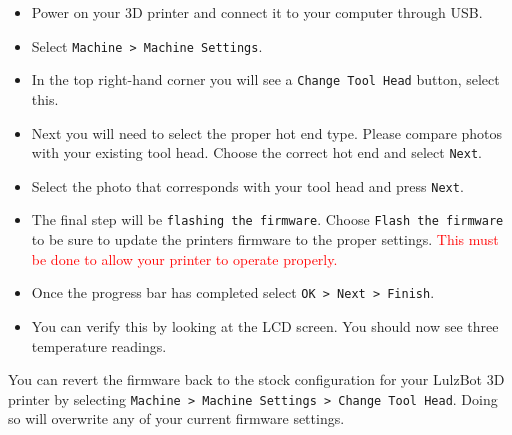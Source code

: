 \begin{itemize}
\item Power on your 3D printer and connect it to your computer through USB.
\item Select \texttt{Machine > Machine Settings}.
\item In the top right-hand corner you will see a \texttt{Change Tool Head} button, select this. 
\item Next you will need to select the proper hot end type. Please compare photos with your existing tool head. Choose the correct hot end and select \texttt{Next}.
\item Select the photo that corresponds with your tool head and press \texttt{Next}.
\item The final step will be \texttt{flashing the firmware}. Choose \texttt{Flash the firmware} to be sure to update the printers firmware to the proper settings. \textcolor{red}{This must be done to allow your printer to operate properly.}
\item Once the progress bar has completed select \texttt{OK > Next > Finish}.  
\item You can verify this by looking at the LCD screen. You should now see three temperature readings. 
\end{itemize} 
You can revert the firmware back to the stock configuration for your LulzBot\textsuperscript{\miniscule{\textregistered}} 3D printer by selecting \texttt{Machine > Machine Settings > Change Tool Head}. Doing so will overwrite any of your current firmware settings.
